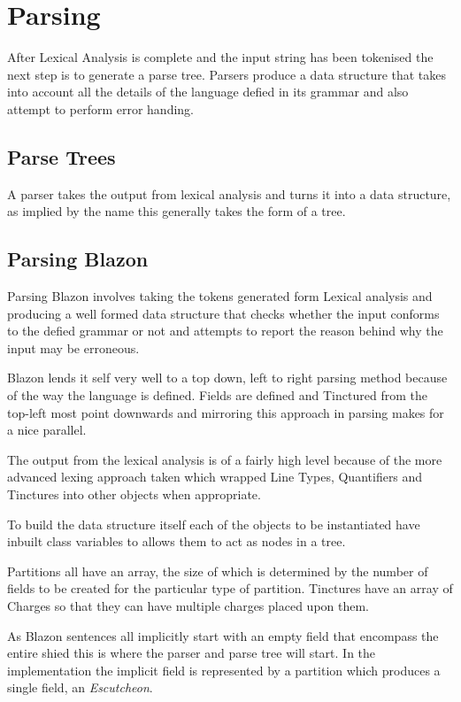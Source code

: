 \chapter{Parsing}

After Lexical Analysis is complete and the input string has been tokenised the next step is to generate a parse tree.  Parsers produce a data structure that takes into account all the details of the language defied in its grammar and also attempt to perform error handing.

\section{Parse Trees}

A parser takes the output from lexical analysis and turns it into a data structure, as implied by the name this generally takes the form of a tree. 





\section{Parsing Blazon}

Parsing Blazon involves taking the tokens generated form Lexical analysis and producing a well formed data structure that checks whether the input conforms to the defied grammar or not and attempts to report the reason behind why the input may be erroneous.

Blazon lends it self very well to a top down, left to right parsing method because of the way the language is defined. Fields are defined and Tinctured from the top-left most point downwards and mirroring this approach in parsing makes for a nice parallel. 

The output from the lexical analysis is of a fairly high level because of the more advanced lexing approach taken which wrapped Line Types, Quantifiers and Tinctures into other objects when appropriate.  

To build the data structure itself each of the objects to be instantiated have inbuilt class variables to allows them to act as nodes in a tree. 

Partitions all have an array, the size of which is determined by the number of fields to be created for the particular type of partition.  Tinctures have an array of Charges so that they can have multiple charges placed upon them. 

As Blazon sentences all implicitly start with an empty field that encompass the entire shied this is where the parser and parse tree will start.  In the implementation the implicit field is represented by a partition which produces a single field,  an \emph{Escutcheon}. 


